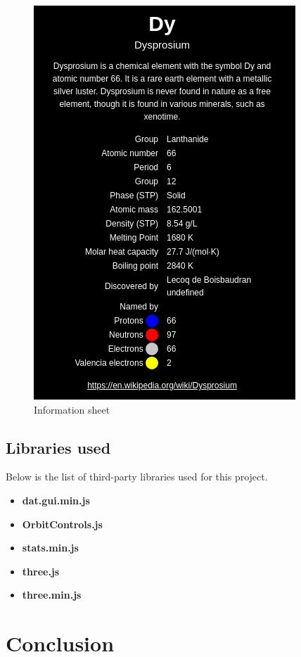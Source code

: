 \documentclass{article}
\begin{document}
\begin{figure}[!ht]
\centering
\includegraphics[scale=0.4]{information.png}
\caption{Information sheet}
\label{fig:fig6}
\end{figure}

\subsection{Libraries used}

Below is the list of third-party libraries used for this project.

\begin{itemize}
    \item \textbf{dat.gui.min.js}
    \item \textbf{OrbitControls.js}
    \item \textbf{stats.min.js}
    \item \textbf{three.js}
    \item \textbf{three.min.js}
\end{itemize}


\section{Conclusion}
\end{document}
